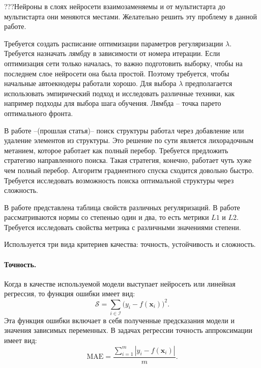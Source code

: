 \documentclass[12pt, twoside]{article}
\newcommand{\xb}{{\mathbf{x}}}
\newenvironment{comment}{}{}
\newcommand{\Smi}{{\mathcal{S}}}
\begin{document}
\begin{comment}

???Нейроны в слоях нейросети взаимозаменяемы и
от мультистарта до мультистарта они меняются местами. Желательно решить эту проблему в данной работе. 

\end{comment}

Требуется создать расписание оптимизации параметров регуляризации $\lambda$. Требуется назначать лямбду в зависимости от номера итерации. Если оптимизация сети только началась, то важно подготовить выборку, чтобы на последнем слое нейросети она была простой. Поэтому требуется, чтобы начальные автоекнодеры работали хорошо. Для выбора $\lambda$ предполагается использовать эмпирический подход и исследовать различные техники, как например подходы для выбора шага обучения. Лямбда – точка парето оптимального фронта.

В работе --(прошлая статья)-- поиск структуры работал через добавление или удаление элементов из структуры. Это решение по сути является лихорадочным метанием, которое работает как полный перебор. Требуется предложить стратегию направленного поиска. Такая стратегия, конечно, работает чуть хуже чем полный перебор. 
Алгоритм градиентного спуска сходится довольно быстро. Требуется исследовать возможность поиска оптимальной структуры через сложность. 




В работе \cite{bib_1} представлена таблица свойств различных регуляризаций. В работе рассматриваются нормы со степенью один и два, то есть метрики $L1$ и $L2$. Требуется исследовать свойства метрика с различными значениями степени. 

Используется три вида критериев качества: точность, устойчивость и сложность.

\paragraph{Точность.}

Когда в качестве используемой модели выступает нейросеть или линейная регрессия, 
то функция ошибки имеет вид:
\begin{equation}\label{eq:mce}
\Smi= \sum_{i\in\mathcal{I}}\big(y_i-f(\xb_i)\big)^2.
\end{equation}
Эта функция ошибки включает в себя полученные предсказания модели и значения зависимых переменных. В задачах регрессии точность аппроксимации имеет вид: 
\begin{equation}\label{eq106}
\text{MAE} =\frac{ \sum\limits_{i=1}^m|y_i-f(\xb_i)|}{m}.
\end{equation}
\end{document}
